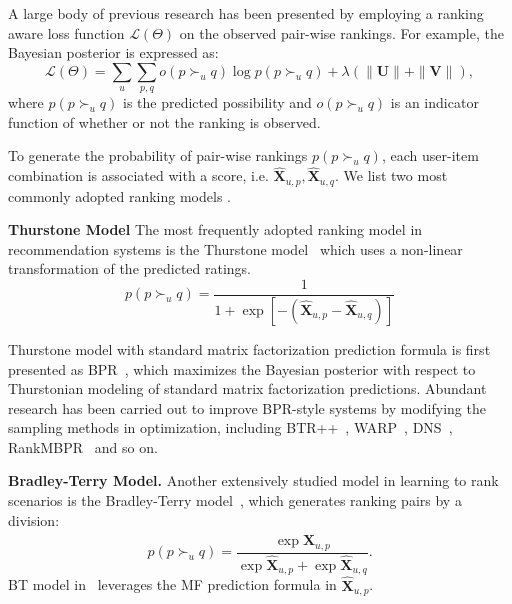 \documentclass[letterpaper]{article} %
\newcommand{\Rating}{\mathbf{X}}
\newcommand{\Loss}{\mathcal{L}}
\begin{document}
A large body of previous research has been presented by employing a ranking aware loss function  $\Loss(\Theta)$ on the observed pair-wise rankings. For example, the Bayesian posterior is expressed as:
\begin{equation}
\Loss(\Theta) = \sum_{u}\sum_{p,q} o(p\succ_u q) \log p(p\succ_u q) + \lambda(\|\mathbf{U}\| + \|\mathbf{V}\|),
\end{equation}
where $p(p\succ_u q)$ is the predicted possibility and $o(p\succ_u q)$ is an indicator function of whether or not the ranking is observed. 

To generate the probability of pair-wise rankings $p(p\succ_u q)$,  each user-item combination is associated with a score, i.e. $\hat{\Rating}_{u,p},\hat{\Rating}_{u,q}$.  We list two most commonly adopted ranking models . 


\textbf{Thurstone Model} The most frequently adopted ranking model in recommendation systems is the Thurstone model~\cite{Thurstone1927law} which uses a non-linear transformation of the predicted ratings. 
\begin{equation}
p(p\succ_u q) = \frac{1} {1+\exp[-(\hat{\Rating}_{u,p}-\hat{\Rating}_{u,q})]}
\end{equation}

Thurstone model with standard matrix factorization prediction formula is first presented as BPR~\cite{Rendle2009BPR}, which maximizes the Bayesian posterior with respect to Thurstonian modeling of standard matrix factorization predictions. Abundant research has been carried out to improve BPR-style systems by modifying the sampling methods in optimization, including BTR++~\cite{Lerche2014Using}, WARP~\cite{Weston2011Wsabie}, DNS~\cite{Zhang2013Optimizing}, RankMBPR~\cite{Yu2016RankMBPR} and so on.

\textbf{Bradley-Terry Model.} Another extensively studied model in learning to rank scenarios is the Bradley-Terry model~\cite{Hunter2004MM}, which generates ranking pairs by a division:
\begin{equation}\label{equ:BT}
p(p\succ_u q) = \frac{\exp{\hat{\Rating}_{u,p}}}{\exp{\hat{\Rating}_{u,p}}+ \exp{\hat{\Rating}_{u,q}}}.
\end{equation}
BT model in~\cite{Hu2016Improved} leverages the MF prediction formula  in $\hat{\Rating}_{u,p}$. 
\end{document}
